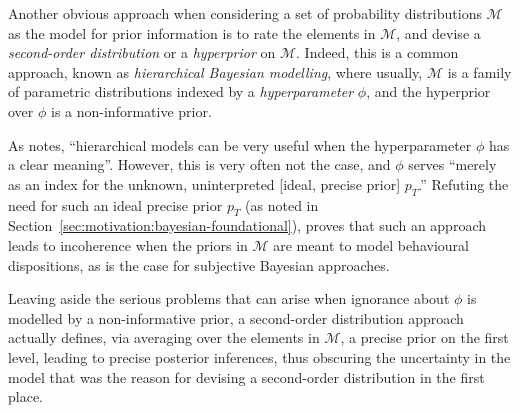 Another obvious approach when considering a set of probability distributions $\mathcal{M}$
as the model for prior information is to rate the elements in $\mathcal{M}$,
and devise a \emph{second-order distribution} or a \emph{hyperprior} on $\mathcal{M}$.
Indeed, this is a common approach, known as \emph{hierarchical Bayesian modelling},
where usually, $\mathcal{M}$ is a family of parametric distributions indexed
by a \emph{hyperparameter} $\phi$, and the hyperprior over $\phi$ is a non-informative prior.

As \textcite[\S 5.10.4, p.~260]{1991:walley} notes,
``hierarchical models can be very useful when the hyperparameter $\phi$ has a clear meaning''.
However, this is very often not the case, and $\phi$ serves 
``merely as an index for the unknown, uninterpreted [ideal, precise prior] $p_T$.''
Refuting the need for such an ideal precise prior $p_T$ (as noted in Section~\ref{sec:motivation:bayesian-foundational}),
\textcite[\S 5.10.2]{1991:walley} proves that such an approach leads to incoherence
when the priors in $\mathcal{M}$ are meant to model behavioural dispositions,
as is the case for subjective Bayesian approaches.

Leaving aside the serious problems that can arise when ignorance about $\phi$ is modelled by a non-informative prior,
a second-order distribution approach actually defines, via averaging over the elements in $\mathcal{M}$,
a precise prior on the first level, leading to precise posterior inferences,
thus obscuring the uncertainty in the model that was the reason
for devising a second-order distribution in the first place.

